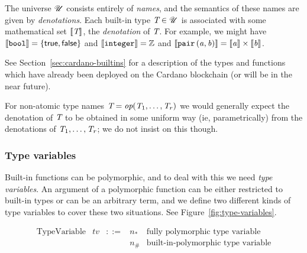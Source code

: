 

The universe $\mathscr{U}$ consists entirely of \textit{names}, and the semantics of
these names are given by \textit{denotations}. Each built-in type $\textit{T} \in \mathscr{U}$
is associated with some mathematical set $\llbracket\mathit{\textit{T}}\rrbracket$, the \textit{denotation}
of $\textit{T}$. For example, we might have $\llbracket\mathit{\texttt{bool}}\rrbracket=
\{\mathsf{true}, \mathsf{false}\}$ and $\llbracket\mathit{\texttt{integer}}\rrbracket = \mathbb{Z}$
and $\llbracket\mathit{\mathtt{pair}\,\mathtt{(}a\mathtt{,}\,b\mathtt{)}}\rrbracket = \llbracket\mathit{a}\rrbracket \times \llbracket\mathit{b}\rrbracket$.

See Section~\ref{sec:cardano-builtins}
for a description of the types and functions which have already been deployed on
the Cardano blockchain (or will be in the near future).

For non-atomic type names $\textit{T} = \textit{op}(\textit{T}_1, \ldots, \textit{T}_r)$ we would generally
expect the denotation of $\textit{T}$ to be obtained in some uniform way (ie,
parametrically) from the denotations of $\textit{T}_1, \ldots, \textit{T}_r$; we do not insist
on this though.

\newcommand{\tv}{\ensuremath{\textit{tv}}}

\subsubsection{Type variables}
\label{sec:type-variables}
Built-in functions can be polymorphic, and to deal with this we need
\textit{type variables}.  An argument of a polymorphic function can be either
restricted to built-in types or can be an arbitrary term, and we define two
different kinds of type variables to cover these two situations.  See
Figure~\ref{fig:type-variables}.

\begin{minipage}{\linewidth}
  \centering
      \[\begin{array}{lrclr}
        \textrm{TypeVariable}    & \tv & ::= & n_{*} & \textrm{fully polymorphic type variable}\\
                                 &           &      & n_{\#} & \textrm{built-in-polymorphic type variable}\\
    \end{array}\]
    \label{fig:type-variables}
\end{minipage}


